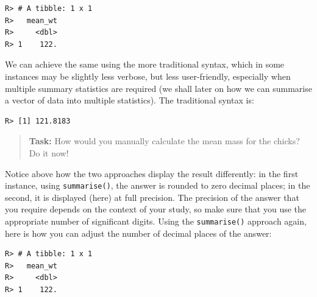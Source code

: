 \documentclass[english,10pt,a4paper,oneside]{book}
\newenvironment{Shaded}{\begin{snugshade}}{\end{snugshade}}
\newcommand{\CommentTok}[1]{\textcolor[rgb]{0.56,0.35,0.01}{\textit{#1}}}
\newcommand{\DataTypeTok}[1]{\textcolor[rgb]{0.13,0.29,0.53}{#1}}
\newcommand{\DecValTok}[1]{\textcolor[rgb]{0.00,0.00,0.81}{#1}}
\newcommand{\KeywordTok}[1]{\textcolor[rgb]{0.13,0.29,0.53}{\textbf{#1}}}
\newcommand{\NormalTok}[1]{#1}
\newcommand{\OperatorTok}[1]{\textcolor[rgb]{0.81,0.36,0.00}{\textbf{#1}}}
\newcommand{\StringTok}[1]{\textcolor[rgb]{0.31,0.60,0.02}{#1}}
\theoremstyle{definition}
\theoremstyle{definition}
\theoremstyle{definition}
\theoremstyle{remark}
\begin{document}
\begin{verbatim}
R> # A tibble: 1 x 1
R>   mean_wt
R>     <dbl>
R> 1    122.
\end{verbatim}

We can achieve the same using the more traditional syntax, which in some
instances may be slightly less verbose, but less user-friendly,
especially when multiple summary statistics are required (we shall later
on how we can summarise a vector of data into multiple statistics). The
traditional syntax is:

\begin{Shaded}
\end{Shaded}

\begin{verbatim}
R> [1] 121.8183
\end{verbatim}

\begin{quote}
\textbf{Task:} How would you manually calculate the mean mass for the
chicks? Do it now!
\end{quote}

Notice above how the two approaches display the result differently: in
the first instance, using \texttt{summarise()}, the answer is rounded to
zero decimal places; in the second, it is displayed (here) at full
precision. The precision of the answer that you require depends on the
context of your study, so make sure that you use the appropriate number
of significant digits. Using the \texttt{summarise()} approach again,
here is how you can adjust the number of decimal places of the answer:

\begin{Shaded}
\end{Shaded}

\begin{verbatim}
R> # A tibble: 1 x 1
R>   mean_wt
R>     <dbl>
R> 1    122.
\end{verbatim}
\end{document}
